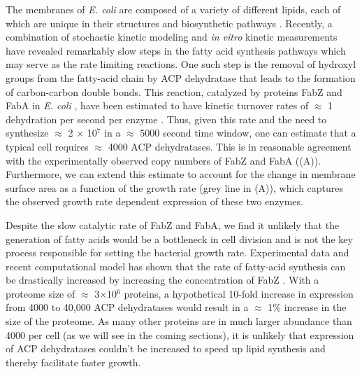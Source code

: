 The membranes of \textit{E. coli} are composed of a variety of different lipids,
each of which are unique in their structures and biosynthetic pathways
\citep{sohlenkamp2016}. Recently, a combination of stochastic kinetic modeling \citep{ruppe2018} and
\textit{in vitro} kinetic measurements \citep{ranganathan2012, yu2011} have
revealed remarkably slow steps in the fatty acid synthesis pathways which may
serve as the rate limiting reactions. One such step is the removal of hydroxyl
groups from the fatty-acid chain by ACP dehydratase that leads to the formation of
carbon-carbon double bonds. This reaction, catalyzed by proteins FabZ and
FabA in \textit{E. coli} \citep{yu2011}, have been estimated to have kinetic
turnover rates of $\approx$ 1 dehydration per second per enzyme
\citep{ruppe2018}. Thus, given this rate and the need to synthesize $\approx$
2 $\times$ 10$^7$ in a $\approx$ 5000 second time window, one can estimate that 
a typical cell requires $\approx$ 4000 ACP dehydratases. This is in
reasonable agreement with the experimentally observed copy numbers of FabZ and
FabA ((A)). Furthermore, we can extend this estimate to
account for the change in membrane surface area as a function of the growth rate
(grey line in (A)), which captures the observed growth rate
dependent expression of these two enzymes.

Despite the slow catalytic rate of FabZ and FabA, we find it unlikely that
the generation of fatty acids would be a bottleneck in cell division and is
not the key process responsible for setting the bacterial growth rate.
Experimental data and recent computational model has shown that the rate of
fatty-acid synthesis can be drastically increased by increasing the
concentration of FabZ \cite{yu2011, ruppe2018}. With a proteome size of
$\approx$ 3$\times$10$^6$ proteins, a hypothetical 10-fold increase in
expression from 4000 to 40,000 ACP dehydratases would result in a $\approx$
1\% increase in the size of the proteome. As many other proteins are in much
larger abundance than 4000 per cell (as we will see in the coming sections),
it is unlikely that expression of ACP dehydratases couldn't be increased to 
speed up lipid synthesis and thereby facilitate faster growth.


